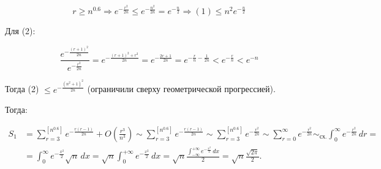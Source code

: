 {  \[
  r\geq n^{0.6} \Rightarrow e^{-\frac{r^2}{2n}} \leq e^{-\frac{n^{2}}{2n}} = e^{-\frac n2} \Rightarrow (1) \leq n^2e^{-\frac n2}
  \]

  Для (2):

  \[
  \frac{ e^{-\frac{(r+1)^2}{2n}} }{ e^{-\frac{r^2}{2n}} } = e^{-\frac{(r+1)^2+r^2}{2n}} = e^{-\frac{2r+1}{2n}} = e^{-\frac rn-\frac{1}{2n}} < e^{-\frac rn} < e^{-n}
  \]

  Тогда (2) $\leq e^{-\frac{(n^2+1)^2}{2n}}$ (ограничили сверху геометрической прогрессией).

  Тогда:

  \begin{align*}
  S_1 &= \sum_{r=3}^{[n^{0.6}]} e^{-\frac{r(r-1)}{2n}} + O\left(\frac{r^3}{n^3}\right) \sim \sum_{r=3}^{[n^{0.6}]} e^{-\frac{r(r-1)}{2n}} \sim \sum_{r=3}^{[n^{0.6}]} e^{-\frac{r^2}{2n}} \sim \sum_{r=0}^{\infty} e^{-\frac{r^2}{2n}} \sim_{\text{сх.}} \int_0^\infty e^{-\frac{r^2}{2n}}\,dr =\\
  &= \int_0^\infty e^{-\frac{x^2}{2}} \sqrt n\,dx = \sqrt n \int_0^{+\infty} e^{-\frac{x^2}{2}}\,dx = \sqrt n \frac{ \int_{-\infty}^{+\infty} e^{-\frac{x^2}{2}}\,dx }{2} = \sqrt n \frac{\sqrt{2\pi}}{2}.
  \end{align*}
}



